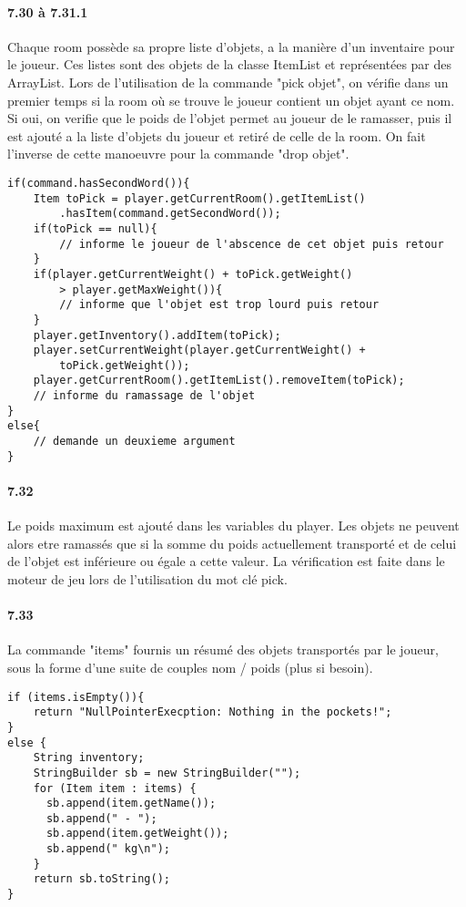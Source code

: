 \documentclass[11pt,a4paper]{report}
\begin{document}
\paragraph{7.30 à 7.31.1}
Chaque room possède sa propre liste d'objets, a la manière d'un inventaire pour le joueur. Ces listes sont des objets de la classe ItemList et représentées par des ArrayList. Lors de l'utilisation de la commande "pick objet", on vérifie dans un premier temps si la room où se trouve le joueur contient un objet ayant ce nom. Si oui, on verifie que le poids de l'objet permet au joueur de le ramasser, puis il est ajouté a la liste d'objets du joueur et retiré de celle de la room. On fait l'inverse de cette manoeuvre pour la commande "drop objet".
\begin{lstlisting}
if(command.hasSecondWord()){
    Item toPick = player.getCurrentRoom().getItemList()
    	.hasItem(command.getSecondWord());
    if(toPick == null){
        // informe le joueur de l'abscence de cet objet puis retour
    }
    if(player.getCurrentWeight() + toPick.getWeight() 
    	> player.getMaxWeight()){
        // informe que l'objet est trop lourd puis retour
    }
    player.getInventory().addItem(toPick);
    player.setCurrentWeight(player.getCurrentWeight() + 
    	toPick.getWeight());
    player.getCurrentRoom().getItemList().removeItem(toPick);
    // informe du ramassage de l'objet
}
else{
    // demande un deuxieme argument
}
\end{lstlisting}

\paragraph{7.32}
Le poids maximum est ajouté dans les variables du player. Les objets ne peuvent alors etre ramassés que si la somme du poids actuellement transporté et de celui de l'objet est inférieure ou égale a cette valeur. La vérification est faite dans le moteur de jeu lors de l'utilisation du mot clé pick.

\paragraph{7.33}
La commande "items" fournis un résumé des objets transportés par le joueur, sous la forme d'une suite de couples nom / poids (plus si besoin).
\begin{lstlisting}
if (items.isEmpty()){
    return "NullPointerExecption: Nothing in the pockets!";
}
else {
    String inventory;
    StringBuilder sb = new StringBuilder("");
    for (Item item : items) {
      sb.append(item.getName());
      sb.append(" - ");
      sb.append(item.getWeight());
      sb.append(" kg\n");
    }
    return sb.toString();
}
\end{lstlisting}
\end{document}
